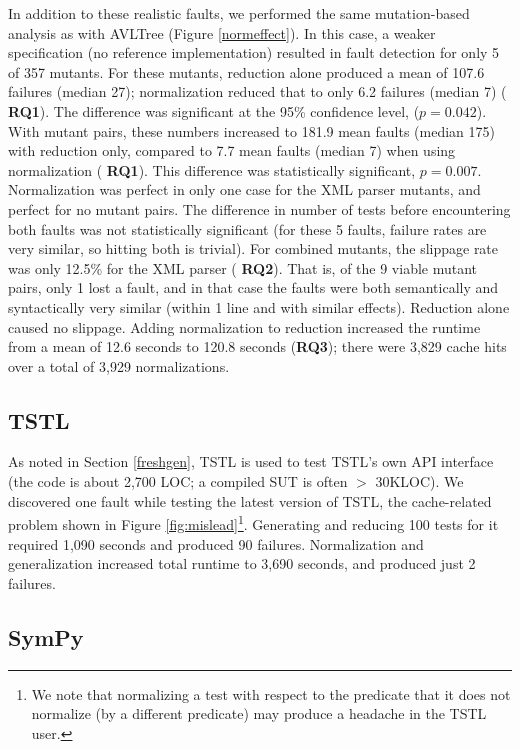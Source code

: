 In addition to these realistic faults, we performed the same
mutation-based analysis as with AVLTree (Figure \ref{normeffect}). In
this case, a weaker specification (no reference implementation)
resulted in fault detection for only 5 of 357 mutants.  For these
mutants, reduction alone produced a mean of 107.6 failures (median
27); normalization reduced that to only 6.2 failures (median 7) ({\bf
  RQ1}).  The difference was significant at the 95\% confidence level,
($p=0.042$).  With mutant pairs, these numbers
increased to 181.9 mean faults (median 175) with reduction only,
compared to 7.7 mean faults (median 7) when using normalization ({\bf
  RQ1}).  This difference was statistically significant, 
$p=0.007$.  Normalization was perfect in only one case for
the XML parser mutants, and perfect for no mutant pairs.  The
difference in number of tests before encountering both faults
was not statistically significant (for these 5 faults,
failure rates are very similar, so hitting both is trivial).  For combined
mutants, the slippage rate was only 12.5\% for the XML parser ({\bf
  RQ2}).  That is, of the 9 viable mutant pairs, only 1 lost a fault,
and in that case the faults were both semantically and syntactically
very similar (within 1 line and with similar effects).  Reduction alone caused no slippage.  Adding normalization to reduction increased the runtime from
a mean of 12.6 seconds to 120.8 seconds ({\bf RQ3}); there were 3,829 cache hits over
a total of 3,929 normalizations.

\subsection{TSTL}

As noted in Section \ref{freshgen}, TSTL is used to test TSTL's own
API interface (the code is about 2,700 LOC; a compiled SUT is
often $>$ 30KLOC).  We discovered one fault while testing
the latest version of TSTL, the cache-related problem shown in Figure
\ref{fig:mislead}\footnote{We note that normalizing a test with
  respect to the predicate that it does not normalize (by a different
  predicate) may produce a headache in the TSTL user.}.
Generating and reducing 100 tests for it required 1,090 seconds
and produced 90 failures.  Normalization and generalization
increased total runtime to 3,690 seconds, and produced just 2
failures.

\subsection{SymPy}

